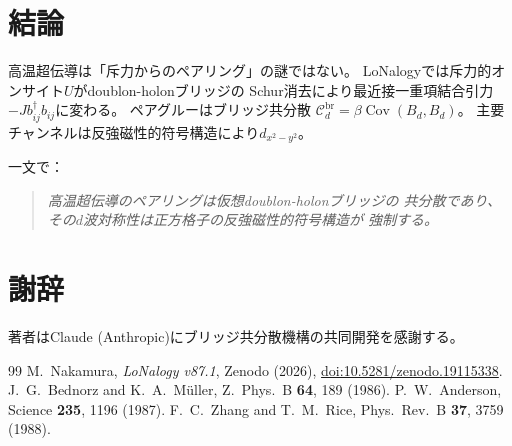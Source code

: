 \documentclass[12pt]{article}
\theoremstyle{plain}
\theoremstyle{definition}
\numberwithin{equation}{section}
\newcommand{\br}{\mathrm{br}}
\DeclareMathOperator{\Cov}{Cov}
\begin{document}
\section*{結論}

高温超伝導は「斥力からのペアリング」の謎ではない。
LoNalogyでは斥力的オンサイト$U$がdoublon-holonブリッジの
Schur消去により最近接一重項結合引力
$-Jb_{ij}^\dagger b_{ij}$に変わる。
ペアグルーはブリッジ共分散
$\mathcal{C}_d^{\br}=\beta\Cov(B_d,B_d)$。
主要チャンネルは反強磁性的符号構造により$d_{x^2-y^2}$。

一文で：

\begin{quote}
\emph{高温超伝導のペアリングは仮想doublon-holonブリッジの
共分散であり、その$d$波対称性は正方格子の反強磁性的符号構造が
強制する。}
\end{quote}


\section*{謝辞}

著者はClaude (Anthropic)にブリッジ共分散機構の共同開発を感謝する。


\begin{thebibliography}{99}
 M.~Nakamura, \textit{LoNalogy v87.1},
Zenodo (2026),
\href{https://doi.org/10.5281/zenodo.19115338}{doi:10.5281/zenodo.19115338}.
 J.~G.~Bednorz and K.~A.~M\"uller,
Z.\ Phys.\ B \textbf{64}, 189 (1986).
 P.~W.~Anderson,
Science \textbf{235}, 1196 (1987).
 F.~C.~Zhang and T.~M.~Rice,
Phys.\ Rev.\ B \textbf{37}, 3759 (1988).
\end{thebibliography}
\end{document}
